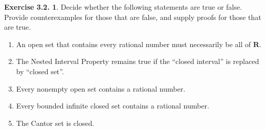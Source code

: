 \documentclass[12pt]{article}
\theoremstyle{definition}
\theoremstyle{exercise}
\newtheorem{exercise}{Exercise 3.2.}
\theoremstyle{solution}
\newcommand{\R}{\mathbf{R}}
\begin{document}
\begin{exercise}
\label{ex:6}
    Decide whether the following statements are true or false. Provide counterexamples for those that are false, and supply proofs for those that are true.
    \begin{enumerate}
        \item An open set that contains every rational number must necessarily be all of \( \R \).

        \item The Nested Interval Property remains true if the ``closed interval'' is replaced by ``closed set''.

        \item Every nonempty open set contains a rational number.

        \item Every bounded infinite closed set contains a rational number.

        \item The Cantor set is closed.
    \end{enumerate}
\end{exercise}
\end{document}
